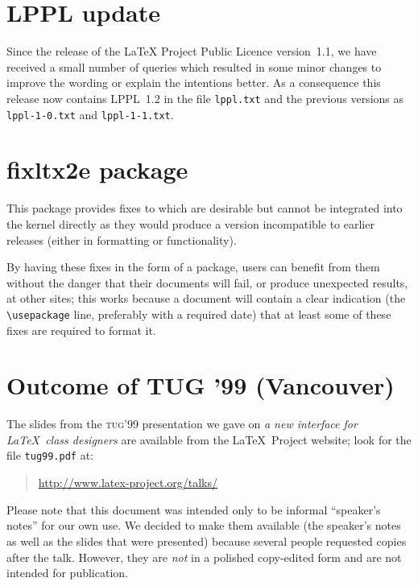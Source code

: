 \documentclass{ltnews}
\providecommand{\acro}[1]{\textsc{\MakeLowercase{#1}}}
\providecommand\file[1]{\texttt{#1}}
\begin{document}
\maketitle

\section{LPPL update}

Since  the release of the \LaTeX{} Project Public Licence version~1.1,
we have received a small number of queries which resulted in some
minor changes to improve the wording or explain the intentions better.
As a consequence this release now contains LPPL~1.2 in the file
\file{lppl.txt} and the previous versions as \file{lppl-1-0.txt} and
\file{lppl-1-1.txt}.

\section{fixltx2e package}

    This package provides fixes to \LaTeXe{} which are desirable but
    cannot be integrated into the \LaTeXe{} kernel directly as they
    would produce a version incompatible to earlier releases (either
    in formatting or functionality).

    By having these fixes in the form of a package, users can benefit
    from them without the danger that their documents will fail, or
    produce unexpected results, at other sites; this works because a
    document will contain a clear indication (the \verb=\usepackage=
    line, preferably with a required date) that at least some of these
    fixes are required to format it.

\section{Outcome of TUG '99 (Vancouver)}

The slides from the \acro{TUG}'99 presentation we gave on \emph{a
new interface for \LaTeX\ class designers} are available from the
\LaTeX\ Project website; look for the file \verb|tug99.pdf| at:
\begin{quote}
   \url{http://www.latex-project.org/talks/}
\end{quote}

Please note that this document was intended only to be informal
``speaker's notes'' for our own use. We decided to make them available (the
speaker's notes as well as the slides that were presented) because several
people requested copies after the talk. However, they are \emph{not} in
a polished copy-edited form and are not intended for publication.
\end{document}
